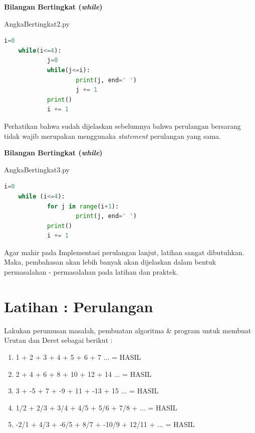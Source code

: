 \begin{contoh}
	\textbf{Bilangan Bertingkat (\textit{while})}
	\label{cth:angkaBertingkat2}
\begin{listprog}{AngkaBertingkat2.py}
\label{lst:angkaBertingkat2}
\begin{lstlisting}[language=Python]
	i=0
	while(i<=4):
			j=0    
			while(j<=i):
					print(j, end=' ')
					j += 1
			print()
			i += 1
	\end{lstlisting}
\end{listprog}
\end{contoh}

Perhatikan bahwa sudah dijelaskan sebelumnya bahwa perulangan bersarang tidak wajib merupakan menggunaka \textit{statement} perulangan yang sama.

\begin{contoh}
	\textbf{Bilangan Bertingkat (\textit{while})}
	\label{cth:angkaBertingkat3}
\begin{listprog}{AngkaBertingkat3.py}
\label{lst:angkaBertingkat3}
\begin{lstlisting}[language=Python]
	i=0
	while (i<=4):
			for j in range(i+1):
					print(j, end=' ')
			print()
			i += 1
	\end{lstlisting}
\end{listprog}
\end{contoh}



Agar mahir pada Implementasi perulangan lanjut, latihan sangat dibutuhkan. Maka, pembahasan akan lebih banyak akan dijelaskan dalam bentuk permasalahan - permasalahan pada latihan dan praktek. 

\section{Latihan : Perulangan}

\begin{pemrograman}
Lakukan perumusan masalah, pembuatan algoritma \& program untuk membuat Urutan dan Deret sebagai berikut : 
\begin{enumerate}
	\item 1 + 2 + 3 + 4 + 5 + 6 + 7 ...  = HASIL
	\item 2 + 4 + 6 + 8 + 10 + 12 + 14 ...  = HASIL
	\item 3 + -5 + 7 + -9 + 11 + -13 + 15 ... = HASIL
	\item 1/2 + 2/3 + 3/4 + 4/5 + 5/6 + 7/8 + ...  = HASIL
	\item -2/1 + 4/3 + -6/5 + 8/7 + -10/9 + 12/11 + ...  = HASIL
\end{enumerate}
\end{pemrograman}

